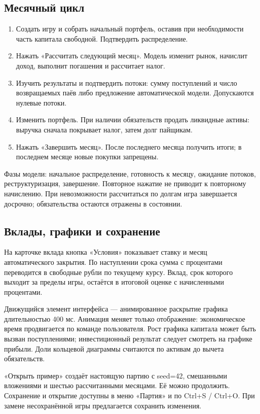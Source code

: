 \documentclass[11pt,a4paper]{article}
\begin{document}
\subsection*{Месячный цикл}
\begin{enumerate}
\item Создать игру и собрать начальный портфель, оставив при необходимости часть капитала свободной. Подтвердить распределение.
\item Нажать «Рассчитать следующий месяц». Модель изменит рынок, начислит доход, выполнит погашения и рассчитает налог.
\item Изучить результаты и подтвердить потоки: сумму поступлений и число возвращаемых паёв либо предложение автоматической модели. Допускаются нулевые потоки.
\item Изменить портфель. При наличии обязательств продать ликвидные активы: выручка сначала покрывает налог, затем долг пайщикам.
\item Нажать «Завершить месяц». После последнего месяца получить итоги; в последнем месяце новые покупки запрещены.
\end{enumerate}
Фазы модели: начальное распределение, готовность к месяцу, ожидание потоков, реструктуризация, завершение. Повторное нажатие не приводит к повторному начислению. При невозможности рассчитаться по долгам игра завершается досрочно; обязательства остаются отражены в состоянии.

\subsection*{Вклады, графики и сохранение}
На карточке вклада кнопка «Условия» показывает ставку и месяц автоматического закрытия. По наступлении срока сумма с процентами переводится в свободные рубли по текущему курсу. Вклад, срок которого выходит за пределы игры, остаётся в итоговой оценке с начисленными процентами.

Движущийся элемент интерфейса --- анимированное раскрытие графика длительностью 400 мс. Анимация меняет только отображение: экономическое время продвигается по команде пользователя. Рост графика капитала может быть вызван поступлениями; инвестиционный результат следует смотреть на графике прибыли. Доли кольцевой диаграммы считаются по активам до вычета обязательств.

«Открыть пример» создаёт настоящую партию с seed=42, смешанными вложениями и шестью рассчитанными месяцами. Её можно продолжить. Сохранение и открытие доступны в меню «Партия» и по Ctrl+S / Ctrl+O. При замене несохранённой игры предлагается сохранить изменения.
\end{document}
